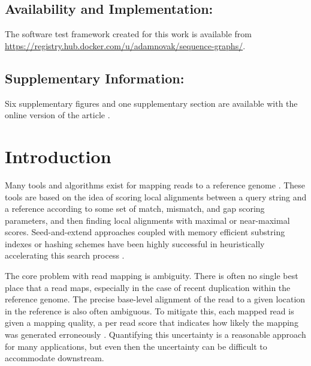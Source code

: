 \subsection{Availability and Implementation:}
The software test framework created for this work is available from \url{https://registry.hub.docker.com/u/adamnovak/sequence-graphs/}.

\subsection{Supplementary Information:} Six supplementary figures and one supplementary section are available with the online version of the article \citet{novak2015canonical}.

\section{Introduction}


Many tools and algorithms exist for mapping reads to a reference genome \citep{li2010fast,langmead2009ultrafast,harris2007improved}. These tools are based on the idea of scoring local alignments between a query string and a reference according to some set of match, mismatch, and gap scoring parameters, and then finding local alignments with maximal or near-maximal scores. Seed-and-extend approaches coupled with memory efficient substring indexes or hashing schemes have been highly successful in heuristically accelerating this search process \citep{dobin2013star,li2010fast,langmead2009ultrafast}. 

The core problem with read mapping is ambiguity. There is often no single best place that a read maps, especially in the case of recent duplication within the reference genome. The precise base-level alignment of the read to a given location in the reference is also often ambiguous. To mitigate this, each mapped read is given a mapping quality, a per read score that indicates how likely the mapping was generated erroneously \citep{li2008mapping}. Quantifying this uncertainty is a reasonable approach for many applications, but even then the uncertainty can be difficult to accommodate downstream.

